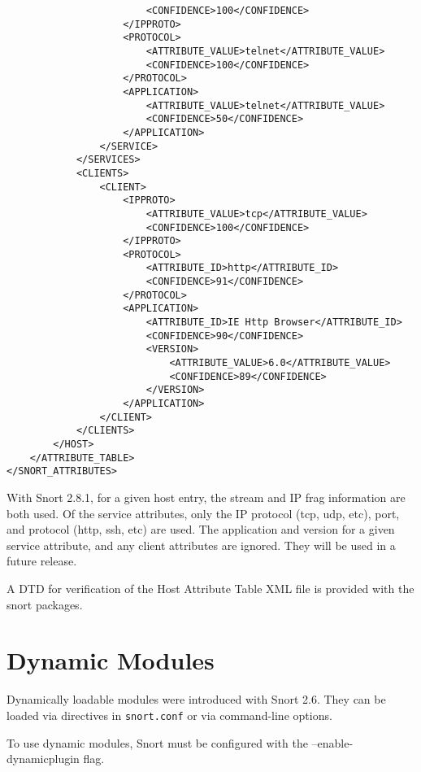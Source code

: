 \documentclass[english]{report}
\newenvironment{note}{
\samepage
    \vspace{10pt}{\textsf{
        {\hspace{7pt}\Huge{$\triangle$\hspace{-12.5pt}{\Large{$^!$}}}}\hspace{5pt}
        {\Large{NOTE}}
    }
    }
   \begin{center}
    \par\vspace{-17pt}

    \begin{lrbox}{\savepar}
    \begin{minipage}[r]{6in}
}
{
    \end{minipage}
    \end{lrbox}
    \fbox{
        \usebox{
            \savepar
	}
    }
    \par\vskip10pt
    \end{center}
}
\begin{document}
\begin{verbatim}
                        <CONFIDENCE>100</CONFIDENCE>
                    </IPPROTO>
                    <PROTOCOL>
                        <ATTRIBUTE_VALUE>telnet</ATTRIBUTE_VALUE>
                        <CONFIDENCE>100</CONFIDENCE>
                    </PROTOCOL>
                    <APPLICATION>
                        <ATTRIBUTE_VALUE>telnet</ATTRIBUTE_VALUE>
                        <CONFIDENCE>50</CONFIDENCE>
                    </APPLICATION>
                </SERVICE>
            </SERVICES>
            <CLIENTS>
                <CLIENT>
                    <IPPROTO>
                        <ATTRIBUTE_VALUE>tcp</ATTRIBUTE_VALUE>
                        <CONFIDENCE>100</CONFIDENCE>
                    </IPPROTO>
                    <PROTOCOL>
                        <ATTRIBUTE_ID>http</ATTRIBUTE_ID>
                        <CONFIDENCE>91</CONFIDENCE>
                    </PROTOCOL>
                    <APPLICATION>
                        <ATTRIBUTE_ID>IE Http Browser</ATTRIBUTE_ID>
                        <CONFIDENCE>90</CONFIDENCE>
                        <VERSION>
                            <ATTRIBUTE_VALUE>6.0</ATTRIBUTE_VALUE>
                            <CONFIDENCE>89</CONFIDENCE>
                        </VERSION>
                    </APPLICATION>
                </CLIENT>
            </CLIENTS>
        </HOST>
    </ATTRIBUTE_TABLE>
</SNORT_ATTRIBUTES>
\end{verbatim}

\begin{note}
With Snort 2.8.1, for a given host entry, the stream and IP frag information
are both used.  Of the service attributes, only the IP protocol (tcp, udp,
etc), port, and protocol (http, ssh, etc) are used.  The application and
version for a given service attribute, and any client attributes are
ignored.  They will be used in a future release.
\end{note}

A DTD for verification of the Host Attribute Table XML file is provided
with the snort packages.

\section{Dynamic Modules}

Dynamically loadable modules were introduced with Snort 2.6.  They can
be loaded via directives in \texttt{snort.conf} or via command-line options.

\begin{note}
To use dynamic modules, Snort must be configured with the
--enable-dynamicplugin flag.
\end{note}
\end{document}
